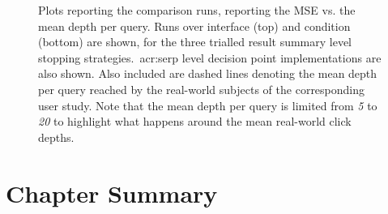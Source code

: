 \begin{figure}[t!]
    \centering
    \caption[Real-world comparisons over the~\gls{acr:serp} decision point]{Plots reporting the comparison runs, reporting the MSE vs. the mean depth per query. Runs over interface  (top) and condition  (bottom) are shown, for the three trialled result summary level stopping strategies.~\gls{acr:serp} level decision point implementations are also shown. Also included are dashed lines denoting the mean depth per query reached by the real-world subjects of the corresponding user study. Note that the mean depth per query is limited from \emph{5} to \emph{20} to highlight what happens around the mean real-world click depths.}
    \label{fig:ch9_comparison_plots}
\end{figure}

\section{Chapter Summary}